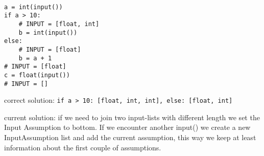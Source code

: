 \documentclass[11pt]{article}
\begin{document}
\begin{lstlisting}[numbers=none]

a = int(input())
if a > 10:
    # INPUT = [float, int]
    b = int(input())
else:
    # INPUT = [float]
    b = a + 1
# INPUT = [float]
c = float(input())
# INPUT = []
\end{lstlisting}

correct solution: \verb|if a > 10: [float, int, int], else: [float, int]|

current solution: if we need to join two input-lists with different length we set the Input Assumption to bottom. If we encounter another input() we create a new InputAssumption list and add the current assumption, this way we keep at least information about the first couple of assumptions.
\end{document}
